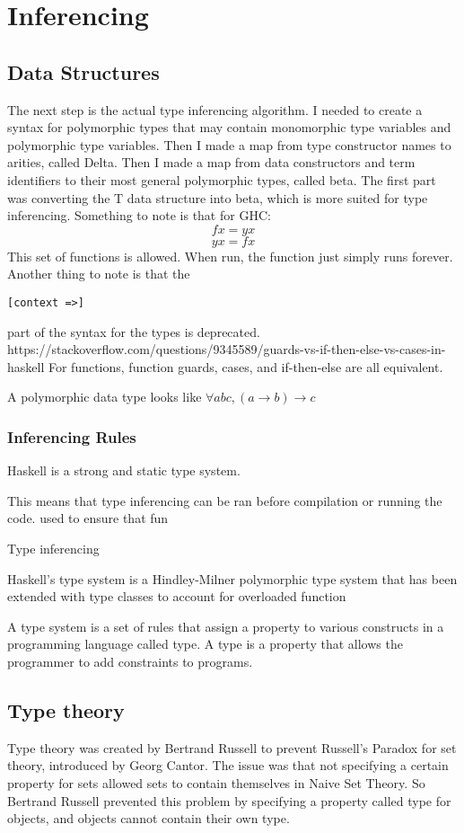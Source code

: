 \chapter{Inferencing}
\section{Data Structures}
The next step is the actual type inferencing algorithm.
	I needed to create a syntax for polymorphic types that may contain monomorphic type variables and polymorphic type variables.
	Then I made a map from type constructor names to arities, called Delta.
	Then I made a map from data constructors and term identifiers to their most general polymorphic types, called beta.
	The first part was converting the T data structure into beta, which is more suited for type inferencing.
	Something to note is that for GHC:
	$$
f x = y x
$$
$$
y x = f x
$$
This set of functions is allowed. When run, the function just simply runs forever.
	Another thing to note is that the
\begin{lstlisting}
[context =>]
\end{lstlisting}
part of the syntax for the types is deprecated.
https://stackoverflow.com/questions/9345589/guards-vs-if-then-else-vs-cases-in-haskell
For functions, function guards, cases, and if-then-else are all equivalent.

A polymorphic data type looks like $\forall a b c, (a \rightarrow b) \rightarrow c$

\subsection{Inferencing Rules}

Haskell is a strong and static type system.

This means that type inferencing can be ran before compilation or running the code. used to ensure that fun

Type inferencing 

Haskell's type system is a Hindley-Milner polymorphic type system that has been extended with type classes to account for overloaded function

A type system is a set of rules that assign a property to various constructs in a programming language called type. A type is a property that allows the programmer to add constraints to programs.

\section{Type theory}
Type theory was created by Bertrand Russell to prevent Russell's Paradox for set theory, introduced by Georg Cantor. The issue was that not specifying a certain property for sets allowed sets to contain themselves in Naive Set Theory. So Bertrand Russell prevented this problem by specifying a property called type for objects, and objects cannot contain their own type.

